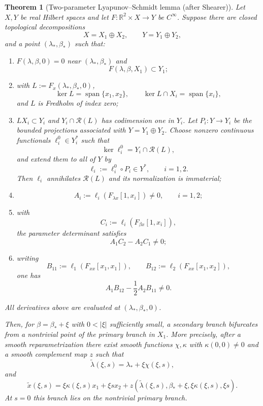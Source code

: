 \documentclass[12pt]{article}
\numberwithin{equation}{section}
\newtheorem{theorem}{Theorem}[section]
\numberwithin{equation}{section}
\begin{document}
\begin{theorem}[Two-parameter Lyapunov--Schmidt lemma (after Shearer)]\label{thm6.2}
Let $X,Y$ be real Hilbert spaces and let
$F:\mathbb R^2\times X\to Y$ be $C^\infty$.  Suppose there are closed topological
decompositions
\[
X=X_1\oplus X_2,\qquad Y=Y_1\oplus Y_2,
\]
and a point $(\lambda_*,\beta_*)$ such that:

\begin{enumerate}[(B1)]
\item $F(\lambda,\beta,0)=0$ near $(\lambda_*,\beta_*)$ and
\[
F(\lambda,\beta,X_1)\subset Y_1;
\]

\item with $L:=F_x(\lambda_*,\beta_*,0)$,
\[
\ker L=\operatorname{span}\{x_1,x_2\},\qquad
\ker L\cap X_i=\operatorname{span}\{x_i\},
\]
and $L$ is Fredholm of index zero;

\item $LX_i\subset Y_i$ and
$Y_i\cap\mathcal R(L)$ has codimension one in $Y_i$.
Let $P_i:Y\to Y_i$ be the bounded projections associated with
$Y=Y_1\oplus Y_2$.  Choose nonzero continuous functionals
$\ell_i^0\in Y_i^*$ such that
\[
\ker\ell_i^0=Y_i\cap\mathcal R(L),
\]
and extend them to all of $Y$ by
\begin{equation}\label{eq6.extfun}
\ell_i:=\ell_i^0\circ P_i\in Y^*,\qquad i=1,2.
\end{equation}
Then $\ell_i$ annihilates $\mathcal R(L)$ and its normalization is immaterial;

\item
\[
A_i:=\ell_i(F_{\lambda x}[1,x_i])\neq0,
\qquad i=1,2;
\]

\item with
\[
C_i:=\ell_i(F_{\beta x}[1,x_i]),
\]
the parameter determinant satisfies
\[
A_1C_2-A_2C_1\neq0;
\]

\item writing
\[
B_{11}:=\ell_1(F_{xx}[x_1,x_1]),
\qquad
B_{12}:=\ell_2(F_{xx}[x_1,x_2]),
\]
one has
\begin{equation}\label{eq6.quaddet}
A_1B_{12}-\frac12A_2B_{11}\neq0.
\end{equation}
\end{enumerate}
All derivatives above are evaluated at $(\lambda_*,\beta_*,0)$.

Then, for $\beta=\beta_*+\xi$ with $0<|\xi|$ sufficiently small, a secondary
branch bifurcates from a nontrivial point of the primary branch in $X_1$.
More precisely, after a smooth reparametrization there exist smooth functions
$\chi,\kappa$ with $\kappa(0,0)\neq0$ and a smooth complement map $z$ such that
\[
\widetilde\lambda(\xi,s)
=\lambda_*+\xi\chi(\xi,s),
\]
and
\[
\widetilde x(\xi,s)
=
\xi\kappa(\xi,s)x_1+\xi s x_2
+z\!\left(
\widetilde\lambda(\xi,s),\beta_*+\xi,
\xi\kappa(\xi,s),\xi s
\right).
\]
At $s=0$ this branch lies on the nontrivial primary branch.
\end{theorem}
\end{document}
